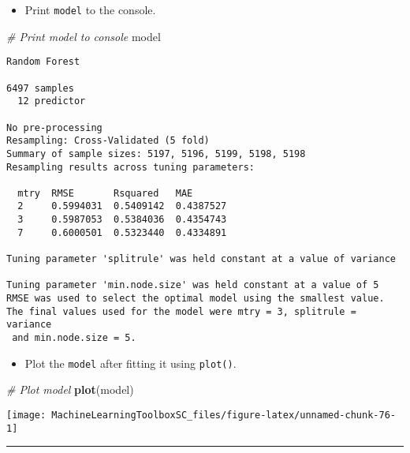 \documentclass[]{book}
\newenvironment{Shaded}{\begin{snugshade}}{\end{snugshade}}
\newcommand{\KeywordTok}[1]{\textcolor[rgb]{0.13,0.29,0.53}{\textbf{#1}}}
\newcommand{\CommentTok}[1]{\textcolor[rgb]{0.56,0.35,0.01}{\textit{#1}}}
\newcommand{\NormalTok}[1]{#1}
\providecommand{\tightlist}{%
  \setlength{\itemsep}{0pt}\setlength{\parskip}{0pt}}
\begin{document}
\begin{itemize}
\tightlist
\item
  Print \texttt{model} to the console.
\end{itemize}

\begin{Shaded}
\begin{Highlighting}[]
\CommentTok{# Print model to console}
\NormalTok{model}
\end{Highlighting}
\end{Shaded}

\begin{verbatim}
Random Forest 

6497 samples
  12 predictor

No pre-processing
Resampling: Cross-Validated (5 fold) 
Summary of sample sizes: 5197, 5196, 5199, 5198, 5198 
Resampling results across tuning parameters:

  mtry  RMSE       Rsquared   MAE      
  2     0.5994031  0.5409142  0.4387527
  3     0.5987053  0.5384036  0.4354743
  7     0.6000501  0.5323440  0.4334891

Tuning parameter 'splitrule' was held constant at a value of variance

Tuning parameter 'min.node.size' was held constant at a value of 5
RMSE was used to select the optimal model using the smallest value.
The final values used for the model were mtry = 3, splitrule = variance
 and min.node.size = 5.
\end{verbatim}

\begin{itemize}
\tightlist
\item
  Plot the \texttt{model} after fitting it using \texttt{plot()}.
\end{itemize}

\begin{Shaded}
\begin{Highlighting}[]
\CommentTok{# Plot model}
\KeywordTok{plot}\NormalTok{(model)}
\end{Highlighting}
\end{Shaded}

\begin{center}\texttt{[image: MachineLearningToolboxSC\_files/figure-latex/unnamed-chunk-76-1]} \end{center}

\begin{center}\rule{0.5\linewidth}{\linethickness}\end{center}
\end{document}
